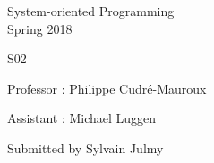 \documentclass[a4paper,11pt]{report}
\author{Sylvain Julmy}
\date{\today}
\begin{document}
\begin{center}
  \Large{
    System-oriented Programming\\
    Spring 2018
  }
  
  \noindent\makebox[\linewidth]{\rule{\linewidth}{0.4pt}}
  S02
  \noindent\makebox[\linewidth]{\rule{\linewidth}{0.4pt}}

  \begin{flushleft}
    Professor : Philippe Cudré-Mauroux

    Assistant : Michael Luggen
  \end{flushleft}
  
  \noindent\makebox[\linewidth]{\rule{\linewidth}{0.4pt}}

  Submitted by Sylvain Julmy
  
  \noindent\makebox[\linewidth]{\rule{\textwidth}{1pt}}
\end{center}


  
  

  

  

  
\end{document}
